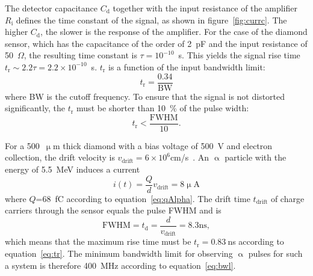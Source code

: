 The detector capacitance $C_\mathrm{d}$ together with the input resistance of the amplifier $R_\mathrm{i}$ defines the time constant of the signal, as shown in figure~\ref{fig:currc}. The higher $C_\mathrm{d}$, the slower is the response of the amplifier. For the case of the diamond sensor, which has the capacitance of the order of 2~pF and the input resistance of 50~$\Omega$, the resulting time constant is $\tau=10^{-10}$~s. This yields the signal rise time $t_\mathrm{r}\sim2.2\tau=2.2\times10^{-10}$~s. $t_\mathrm{r}$ is a function of the input bandwidth limit:
\begin{equation}
\label{eq:bwl}
t_\mathrm{r}=\frac{0.34}{\mathrm{BW}}
\end{equation}
where BW is the cutoff frequency. To ensure that the signal is not distorted significantly, the $t_\mathrm{r}$ must be shorter than 10~\% of the pulse width:
\begin{equation}
\label{eq:tr}
t_\mathrm{r} < \frac{\mathrm{FWHM}}{10}.
\end{equation}

For a 500~$\upmu$m thick diamond with a bias voltage of 500~V and electron collection, the drift velocity is $v_\mathrm{drift}=6\times10^6$cm/s~\cite{Jansen:1956431}. An $\upalpha$ particle with the energy of 5.5~MeV induces a current
\begin{equation}
i(t)=\frac{Q}{d}v_\mathrm{drift} = 8\mathrm{\upmu A}
\end{equation}
where $Q$=68~fC according to equation~\ref{eq:qAlpha}. The drift time $t_\mathrm{drift}$ of charge carriers through the sensor equals the pulse FWHM and is 
\begin{equation}
\mathrm{FWHM} = t_\mathrm{d}=\frac{d}{v_\mathrm{drift}} = 8.3\mathrm{ns},
\end{equation}
which means that the maximum rise time must be $t_\mathrm{r}=0.83~$ns according to equation~\ref{eq:tr}. The minimum bandwidth limit for observing $\upalpha$ pulses for such a system is therefore 400~MHz according to equation~\ref{eq:bwl}. 


